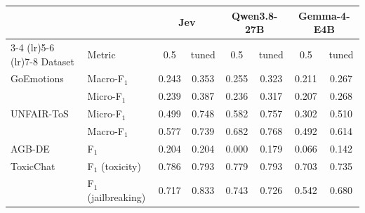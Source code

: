 \begin{tabular}{l l c c c c c c }
    \toprule
    & & \multicolumn{2}{c}{Jev} & \multicolumn{2}{c}{Qwen3.8-27B} & \multicolumn{2}{c}{Gemma-4-E4B} \\
    \cmidrule(lr){3-4} \cmidrule(lr){5-6} \cmidrule(lr){7-8}
    Dataset & Metric & 0.5 & tuned & 0.5 & tuned & 0.5 & tuned \\
    \midrule
    GoEmotions & Macro-F$_\text{1}$ & 0.243 & 0.353 & 0.255 & 0.323 & 0.211 & 0.267 \\
     & Micro-F$_\text{1}$ & 0.239 & 0.387 & 0.236 & 0.317 & 0.207 & 0.268 \\
    \rowcolor{gray!10}UNFAIR-ToS & Micro-F$_\text{1}$ & 0.499 & 0.748 & 0.582 & 0.757 & 0.302 & 0.510 \\
    \rowcolor{gray!10} & Macro-F$_\text{1}$ & 0.577 & 0.739 & 0.682 & 0.768 & 0.492 & 0.614 \\
    AGB-DE & F$_\text{1}$ & 0.204 & 0.204 & 0.000 & 0.179 & 0.066 & 0.142 \\
    \rowcolor{gray!10}ToxicChat & F$_\text{1}$ (toxicity) & 0.786 & 0.793 & 0.779 & 0.793 & 0.703 & 0.735 \\
    \rowcolor{gray!10} & F$_\text{1}$ (jailbreaking) & 0.717 & 0.833 & 0.743 & 0.726 & 0.542 & 0.680 \\
    \bottomrule
\end{tabular}
